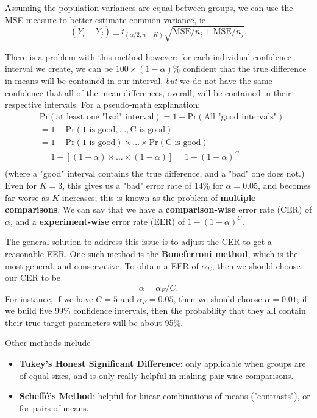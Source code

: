 \documentclass[12pt]{article}
\begin{document}
Assuming the population variances are equal between groups, we can use the MSE measure to better estimate common variance, ie \[(\bar{Y}_i - \bar{Y}_j) \pm t_{(\alpha/2, n-K)} \sqrt{\text{MSE}/n_i + \text{MSE}/n_j}.\]

There is a problem with this method however; for each individual confidence interval we create, we can be $100\times(1-\alpha)\%$ confident that the true difference in means will be contained in our interval, \textit{but} we do not have the same confidence that all of the mean differences, overall, will be contained in their respective intervals. For a pseudo-math explanation: 
\begin{align*}
    &\text{Pr}(\text{at least one "bad" interval}) = 1 - \text{Pr}(\text{All "good intervals"})\\
    &= 1- \text{Pr}(\text{1 is good}, \dots, \text{C is good})\\
    &= 1 - \text{Pr}(\text{1 is good})\times \dots \times \text{Pr}(\text{C is good})\\
    &= 1 - [(1- \alpha) \times \dots \times (1-\alpha)] = 1 - (1-\alpha)^C\\
\end{align*}
(where a "good" interval contains the true difference, and a "bad" one does not.) Even for $K = 3$, this gives us a "bad" error rate of 14\% for $\alpha = 0.05$, and becomes far worse as $K$ increases; this is known as the problem of \textbf{multiple comparisons}. We can say that we have a \textbf{comparison-wise} error rate (CER) of $\alpha$, and a \textbf{experiment-wise} error rate (EER) of $1-(1-\alpha)^C$.

The general solution to address this issue is to adjust the CER to get a reasonable EER. One such method is the \textbf{Boneferroni method}, which is the most general, and conservative. To obtain a EER of $\alpha_E$, then we should choose our CER to be \[\alpha = \alpha_F/C.\] For instance, if we have $C = 5$ and $\alpha_F = 0.05$, then we should choose $\alpha = 0.01$; if we build five 99\% confidence intervals, then the probability that they all contain their true target parameters will be about 95\%. 

Other methods include \begin{itemize}
    \item \textbf{Tukey's Honest Significant Difference}: only applicable when groups are of equal sizes, and is only really helpful in making pair-wise comparisons.
    \item \textbf{Scheffé's Method}: helpful for linear combinations of means ("contrasts"), or for pairs of means.
\end{itemize}
\end{document}
